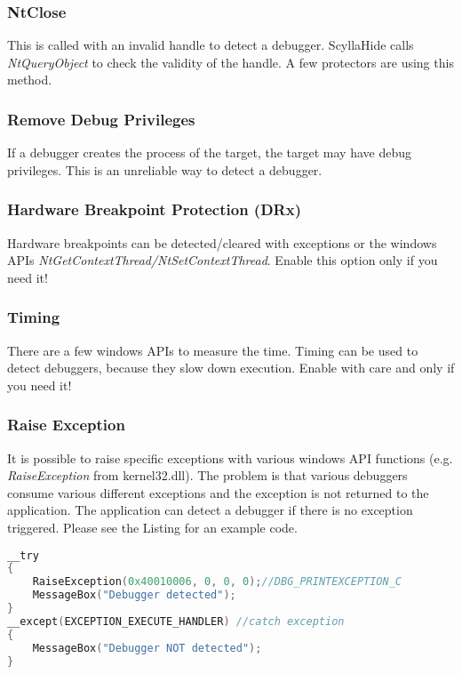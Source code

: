 \documentclass[10pt,a4paper]{article}
\begin{document}
\subsubsection{NtClose}
This is called with an invalid handle to detect a debugger. ScyllaHide calls \textit{NtQueryObject} to check the validity of the handle. A few protectors are using this method.

\subsubsection{Remove Debug Privileges}
If a debugger creates the process of the target, the target may have debug privileges. This is an unreliable way to detect a debugger.

\subsubsection{Hardware Breakpoint Protection (DRx)}
Hardware breakpoints can be detected/cleared with exceptions or the windows APIs \textit{NtGetContextThread/NtSetContextThread}. Enable this option only if you need it!

\subsubsection{Timing}
There are a few windows APIs to measure the time. Timing can be used to detect debuggers, because they slow down execution. Enable with care and only if you need it!

\subsubsection{Raise Exception}
\label{sec:RaiseException_section}
It is possible to raise specific exceptions with various windows API functions (e.g. \textit{RaiseException} from kernel32.dll). The problem is that various debuggers consume various different exceptions and the exception is not returned to the application. The application can detect a debugger if there is no exception triggered. Please see the Listing for an example code.

\begin{lstlisting}[language=C, caption=Raise Exception Example]
__try
{
    RaiseException(0x40010006, 0, 0, 0);//DBG_PRINTEXCEPTION_C
    MessageBox("Debugger detected");
}
__except(EXCEPTION_EXECUTE_HANDLER) //catch exception
{
    MessageBox("Debugger NOT detected");
}
\end{lstlisting}
\end{document}
